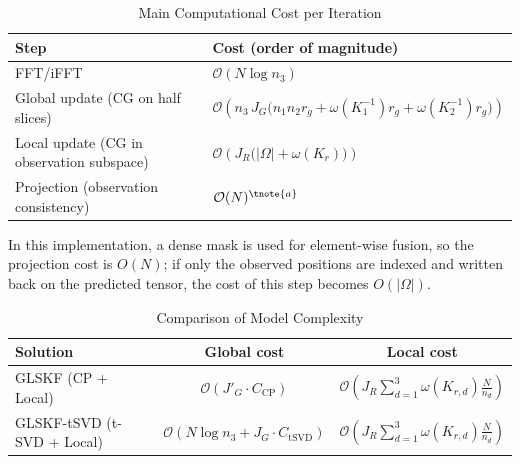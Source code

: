 \documentclass[a4paper,12pt]{article}
\numberwithin{equation}{section}
\numberwithin{algorithm}{section}
\theoremstyle{remark}
\theoremstyle{definition}
\begin{document}
\begin{table}[!htbp]
	\centering
	\caption{Main Computational Cost per Iteration}
	\label{tab:complexity1}
	
	\begin{threeparttable}
		\begin{tabular}{l l}
			\toprule
			Step & Cost (order of magnitude) \\
			\midrule
			FFT/iFFT & $\mathcal{O}(N\log n_3)$ \\
			Global update (CG on half slices) &
			$\mathcal{O}\!\left(n_3\,J_G\big(n_1n_2r_g+\omega(K_1^{-1})r_g+\omega(K_2^{-1})r_g\big)\right)$ \\
			Local update (CG in observation subspace) &
			$\mathcal{O}\!\left(J_R\big(|\Omega|+\omega(K_r)\big)\right)$ \\
			Projection (observation consistency) & $\mathcal{O}(N)^{\tnote{a}}$ \\
			\bottomrule
		\end{tabular}
			
		\begin{tablenotes}[flushleft]
			\footnotesize
			\item[a] In this implementation, a dense mask is used for element-wise fusion, so the projection cost is $O(N)$; if only the observed positions are indexed and written back on the predicted tensor, the cost of this step becomes $O(|\Omega|)$.
		\end{tablenotes}
	\end{threeparttable}
\end{table}

\begin{table}[!htbp]
	\centering
	\caption{Comparison of Model Complexity}
	\label{tab:complexity2}
	\begin{tabular}{l cc}
		\toprule
		Solution & Global cost & Local cost \\\midrule
		GLSKF (CP + Local) & $\mathcal{O}\!\left(J'_G\cdot C_{\text{CP}}\right)$ & $\mathcal{O}\!\left(J_R \sum_{d=1}^{3}\omega(K_{r,d})\frac{N}{n_d}\right)$ \\
		GLSKF-tSVD (t-SVD + Local) & $\mathcal{O}\!\left(N\log n_3 + J_G\cdot C_{\text{tSVD}}\right)$ & $\mathcal{O}\!\left(J_R \sum_{d=1}^{3}\omega(K_{r,d})\frac{N}{n_d}\right)$ \\
		\bottomrule
	\end{tabular}
	\vspace{2pt}
\end{table}
\end{document}
